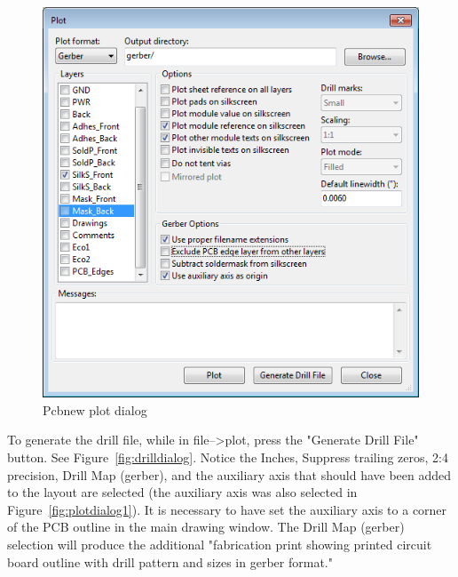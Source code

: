 \begin{figure}[H]
	\centering 
		\includegraphics{./figures/plotdialog2} 
	\caption{Pcbnew plot dialog\label{fig:plotdialog2}}
\end{figure}

To generate the drill file, while in file-->plot, press the "Generate Drill File" button.  See  Figure~\ref{fig:drilldialog}.  Notice the Inches, Suppress trailing zeros, 2:4 precision, Drill Map (gerber), and the auxiliary axis that should have been added to the layout are selected (the auxiliary axis was also selected in Figure~\ref{fig:plotdialog1}).  It is necessary to have set the auxiliary axis to a corner of the PCB outline in the main drawing window.  The Drill Map (gerber) selection will produce the additional "fabrication print showing printed circuit board outline with drill pattern and sizes in gerber format."

